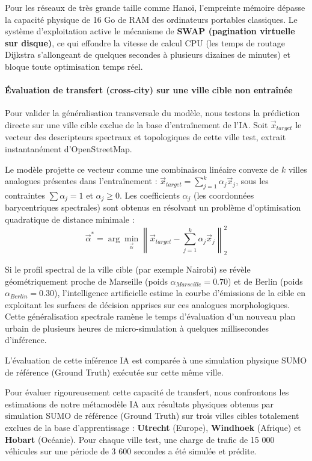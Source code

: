 \documentclass[10pt, a4paper]{article}
\begin{document}
Pour les réseaux de très grande taille comme Hanoï, l'empreinte mémoire
dépasse la capacité physique de 16 Go de RAM des ordinateurs portables
classiques. Le système d'exploitation active le mécanisme de
\textbf{SWAP (pagination virtuelle sur disque)}, ce qui effondre la
vitesse de calcul CPU (les temps de routage Dijkstra s'allongeant de
quelques secondes à plusieurs dizaines de minutes) et bloque toute
optimisation temps réel.

\paragraph{Évaluation de transfert (cross-city) sur une ville cible non
entraînée}\label{uxe9valuation-de-transfert-cross-city-sur-une-ville-cible-non-entrauxeenuxe9e}

Pour valider la généralisation transversale du modèle, nous testons la
prédiction directe sur une ville cible exclue de la base d'entraînement
de l'IA. Soit \(\vec{x}_{target}\) le vecteur des descripteurs spectraux
et topologiques de cette ville test, extrait instantanément
d'OpenStreetMap.

Le modèle projette ce vecteur comme une combinaison linéaire convexe de
\(k\) villes analogues présentes dans l'entraînement :
\(\vec{x}_{target} = \sum_{j=1}^k \alpha_j \vec{x}_j\), sous les
contraintes \(\sum \alpha_j = 1\) et \(\alpha_j \ge 0\). Les
coefficients \(\alpha_j\) (les coordonnées barycentriques spectrales)
sont obtenus en résolvant un problème d'optimisation quadratique de
distance minimale :
\[\vec{\alpha}^* = \arg\min_{\vec{\alpha}} \left\| \vec{x}_{target} - \sum_{j=1}^k \alpha_j \vec{x}_j \right\|_2^2\]

Si le profil spectral de la ville cible (par exemple Nairobi) se révèle
géométriquement proche de Marseille (poids
\(\alpha_{Marseille} = 0.70\)) et de Berlin (poids
\(\alpha_{Berlin} = 0.30\)), l'intelligence artificielle estime la
courbe d'émissions de la cible en exploitant les surfaces de décision
apprises sur ces analogues morphologiques. Cette généralisation
spectrale ramène le temps d'évaluation d'un nouveau plan urbain de
plusieurs heures de micro-simulation à quelques millisecondes
d'inférence.

L'évaluation de cette inférence IA est comparée à une simulation
physique SUMO de référence (Ground Truth) exécutée sur cette même ville.

Pour évaluer rigoureusement cette capacité de transfert, nous
confrontons les estimations de notre métamodèle IA aux résultats
physiques obtenus par simulation SUMO de référence (Ground Truth) sur
trois villes cibles totalement exclues de la base d'apprentissage :
\textbf{Utrecht} (Europe), \textbf{Windhoek} (Afrique) et
\textbf{Hobart} (Océanie). Pour chaque ville test, une charge de trafic
de 15 000 véhicules sur une période de 3 600 secondes a été simulée et
prédite.
\end{document}
